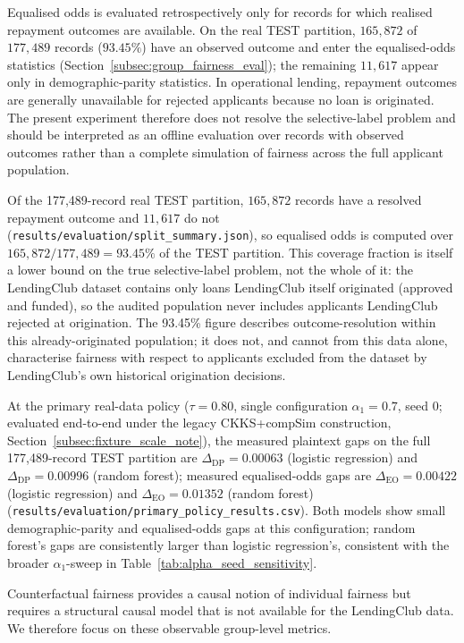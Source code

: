 \documentclass[a4paper,fleqn]{cas-dc}
\begin{document}
Equalised odds is evaluated retrospectively only for records for which realised repayment outcomes are available. On the real TEST partition, $165{,}872$ of $177{,}489$ records ($93.45\%$) have an observed outcome and enter the equalised-odds statistics (Section~\ref{subsec:group_fairness_eval}); the remaining $11{,}617$ appear only in demographic-parity statistics. In operational lending, repayment outcomes are generally unavailable for rejected applicants because no loan is originated. The present experiment therefore does not resolve the selective-label problem and should be interpreted as an offline evaluation over records with observed outcomes rather than a complete simulation of fairness across the full applicant population.

Of the 177{,}489-record real TEST partition, $165{,}872$ records have a resolved repayment outcome and $11{,}617$ do not (\texttt{results/evaluation/split\_summary.json}), so equalised odds is computed over $165{,}872/177{,}489=93.45\%$ of the TEST partition. This coverage fraction is itself a lower bound on the true selective-label problem, not the whole of it: the LendingClub dataset contains only loans LendingClub itself originated (approved and funded), so the audited population never includes applicants LendingClub rejected at origination. The 93.45\% figure describes outcome-resolution within this already-originated population; it does not, and cannot from this data alone, characterise fairness with respect to applicants excluded from the dataset by LendingClub's own historical origination decisions.

At the primary real-data policy ($\tau=0.80$, single configuration $\alpha_1=0.7$, seed $0$; evaluated end-to-end under the legacy CKKS+compSim construction, Section~\ref{subsec:fixture_scale_note}), the measured plaintext gaps on the full 177{,}489-record TEST partition are $\Delta_{\mathrm{DP}}=0.00063$ (logistic regression) and $\Delta_{\mathrm{DP}}=0.00996$ (random forest); measured equalised-odds gaps are $\Delta_{\mathrm{EO}}=0.00422$ (logistic regression) and $\Delta_{\mathrm{EO}}=0.01352$ (random forest) (\texttt{results/evaluation/primary\_policy\_results.csv}). Both models show small demographic-parity and equalised-odds gaps at this configuration; random forest's gaps are consistently larger than logistic regression's, consistent with the broader $\alpha_1$-sweep in Table~\ref{tab:alpha_seed_sensitivity}.


Counterfactual fairness \cite{kusner2017counterfactual} provides a causal notion of individual fairness but requires a structural causal model that is not available for the LendingClub data. We therefore focus on these observable group-level metrics.
\end{document}
